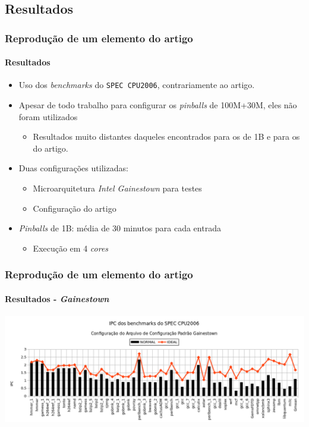 \documentclass[10pt]{beamer}
\begin{document}
\subsection{Resultados}
\begin{frame}
\frametitle{Reprodução de um elemento do artigo}
\framesubtitle{Resultados}

\begin{itemize}
  \item Uso dos \textit{benchmarks} do \texttt{SPEC CPU2006}, contrariamente ao
  artigo.
  \vspace{10pt}
  \item Apesar de todo trabalho para configurar os \textit{pinballs} de
  100M+30M, eles não foram utilizados
  \begin{itemize}
    \item Resultados muito distantes daqueles encontrados para os de 1B e para
    os do artigo.
  \end{itemize}
  \vspace{10pt}
  \item Duas configurações utilizadas:
  \begin{itemize}
    \item Microarquitetura \textit{Intel Gainestown} para testes
    \item Configuração do artigo
  \end{itemize}
  \vspace{10pt}
  \item \textit{Pinballs} de 1B: média de 30 minutos para cada entrada
  \begin{itemize}
    \item Execução em 4 \textit{cores}
  \end{itemize}
\end{itemize}

\end{frame}

\begin{frame}
\frametitle{Reprodução de um elemento do artigo}
\framesubtitle{Resultados - \textit{Gainestown}}

\centering
\includegraphics[width=\textwidth]{images/gainestown}

\end{frame}
\end{document}
